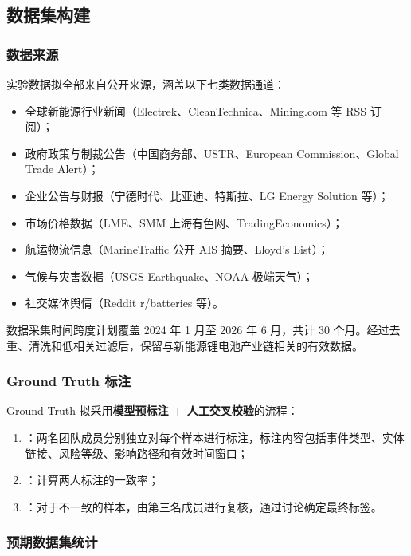 \subsection{数据集构建}
\label{sec:exp-dataset}

\subsubsection{数据来源}

实验数据拟全部来自公开来源，涵盖以下七类数据通道：
\begin{itemize}
    \item 全球新能源行业新闻（Electrek、CleanTechnica、Mining.com 等 RSS 订阅）；
    \item 政府政策与制裁公告（中国商务部、USTR、European Commission、Global Trade Alert）；
    \item 企业公告与财报（宁德时代、比亚迪、特斯拉、LG Energy Solution 等）；
    \item 市场价格数据（LME、SMM 上海有色网、TradingEconomics）；
    \item 航运物流信息（MarineTraffic 公开 AIS 摘要、Lloyd's List）；
    \item 气候与灾害数据（USGS Earthquake、NOAA 极端天气）；
    \item 社交媒体舆情（Reddit r/batteries 等）。
\end{itemize}

数据采集时间跨度计划覆盖 2024 年 1 月至 2026 年 6 月，共计 30 个月。经过去重、清洗和低相关过滤后，保留与新能源锂电池产业链相关的有效数据。

\subsubsection{Ground Truth 标注}

Ground Truth 拟采用\textbf{模型预标注 + 人工交叉校验}的流程：
\begin{enumerate}
    \item {}：两名团队成员分别独立对每个样本进行标注，标注内容包括事件类型、实体链接、风险等级、影响路径和有效时间窗口；
    \item {}：计算两人标注的一致率；
    \item {}：对于不一致的样本，由第三名成员进行复核，通过讨论确定最终标签。
\end{enumerate}

\subsubsection{预期数据集统计}

